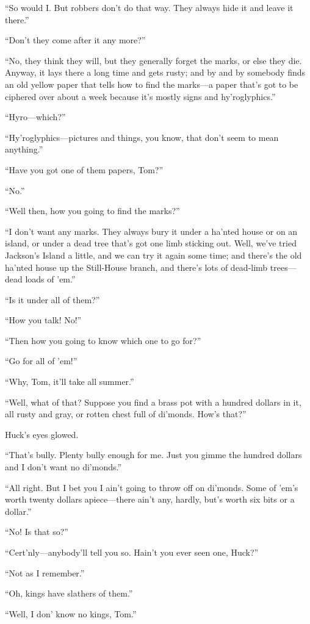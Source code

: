 \documentclass{book}
\begin{document}
“So would I. But robbers don’t do that way. They always hide it and leave it there.”

“Don’t they come after it any more?”

“No, they think they will, but they generally forget the marks, or else they die. Anyway, it lays there a long time and gets rusty; and by and by somebody finds an old yellow paper that tells how to find the marks—a paper that’s got to be ciphered over about a week because it’s mostly signs and hy’roglyphics.”

“Hyro—which?”

“Hy’roglyphics—pictures and things, you know, that don’t seem to mean anything.”

“Have you got one of them papers, Tom?”

“No.”

“Well then, how you going to find the marks?”

“I don’t want any marks. They always bury it under a ha’nted house or on an island, or under a dead tree that’s got one limb sticking out. Well, we’ve tried Jackson’s Island a little, and we can try it again some time; and there’s the old ha’nted house up the Still-House branch, and there’s lots of dead-limb trees—dead loads of ’em.”

“Is it under all of them?”

“How you talk! No!”

“Then how you going to know which one to go for?”

“Go for all of ’em!”

“Why, Tom, it’ll take all summer.”

“Well, what of that? Suppose you find a brass pot with a hundred dollars in it, all rusty and gray, or rotten chest full of di’monds. How’s that?”

Huck’s eyes glowed.

“That’s bully. Plenty bully enough for me. Just you gimme the hundred dollars and I don’t want no di’monds.”

“All right. But I bet you I ain’t going to throw off on di’monds. Some of ’em’s worth twenty dollars apiece—there ain’t any, hardly, but’s worth six bits or a dollar.”

“No! Is that so?”

“Cert’nly—anybody’ll tell you so. Hain’t you ever seen one, Huck?”

“Not as I remember.”

“Oh, kings have slathers of them.”

“Well, I don’ know no kings, Tom.”
\end{document}
